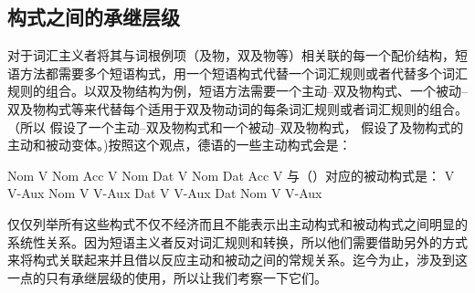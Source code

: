 \begin{exe}
\begin{xlist}[iv.]
\begin{exe}
\begin{xlist}[iv.]
\subsection{构式之间的承继层级}
\label{inheritance-sec}
\label{Abschnitt-Croft}

对于词汇主义者将其与词根例项（及物，双及物等）相关联的每一个配价结构，短语方法都需要多个短语构式，用一个短语构式代替一个词汇规则或者代替多个词汇规则的组合。以双及物结构为例，短语方法需要一个主动--双及物构式、一个被动--双及物构式等来代替每个适用于双及物动词的每条词汇规则或者词汇规则的组合。（所以 假设了一个主动--双及物构式和一个被动--双及物构式， 假设了及物构式的主动和被动变体。)按照这个观点，德语的一些主动构式会是：

\eal
\label{ex-active-valence}
\ex {}Nom V
\ex {}Nom Acc V
\ex {}Nom Dat V
\ex {}Nom Dat Acc V
\zl 
与（）对应的被动构式是：
\eal
\label{ex-passive-valence}
\ex {}V V-Aux
\ex {}Nom V V-Aux
\ex {}Dat V V-Aux
\ex {}Dat Nom V V-Aux
\zl  

\noindent
仅仅列举所有这些构式不仅不经济而且不能表示出主动构式和被动构式之间明显的系统性关系。因为短语主义者反对词汇规则和转换，所以他们需要借助另外的方式来将构式关联起来并且借以反应主动和被动之间的常规关系。迄今为止，涉及到这一点的只有承继层级的使用，所以让我们考察一下它们。


\end{xlist}
\end{exe}
\end{xlist}
\end{exe}
